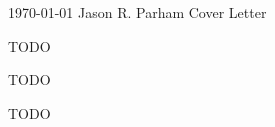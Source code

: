 \documentclass[11pt, letterpaper]{awesome-cv}
\newcommand{\dotSep}{\enskip\cdotp\enskip}
\begin{document}
\makecvheader[R]

\makecvfooter
  {\today}
  {Jason R. Parham \dotSep Cover Letter}
  {}

\makelettertitle

\begin{cvletter}

TODO

TODO

TODO

\end{cvletter}


\makeletterclosing
\end{document}
